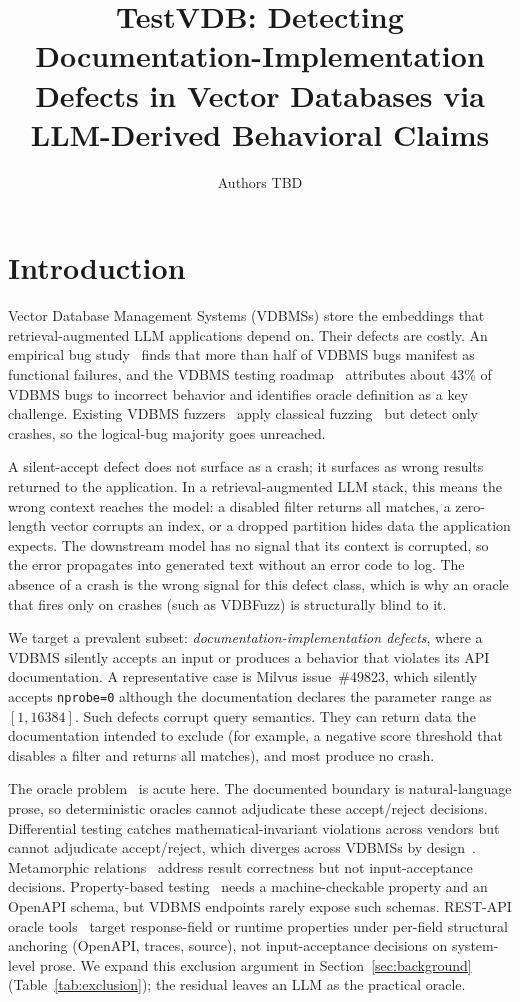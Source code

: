 \documentclass[sigconf]{acmart}
\title[TestVDB: doc-implementation defects in VDBMSs]{TestVDB: Detecting Documentation-Implementation Defects in Vector Databases via LLM-Derived Behavioral Claims}
\author{Authors TBD}
\affiliation{\institution{TBD (anonymity depends on venue)}\country{TBD}}
\begin{document}
\maketitle

\section{Introduction}
\label{sec:intro}

Vector Database Management Systems (VDBMSs) store the embeddings that retrieval-augmented LLM applications depend on. Their defects are costly. An empirical bug study~\cite{bugstudy25} finds that more than half of VDBMS bugs manifest as functional failures, and the VDBMS testing roadmap~\cite{roadmap25} attributes about 43\% of VDBMS bugs to incorrect behavior and identifies oracle definition as a key challenge. Existing VDBMS fuzzers~\cite{vdbfuzz26} apply classical fuzzing~\cite{manes21} but detect only crashes, so the logical-bug majority goes unreached.

A silent-accept defect does not surface as a crash; it surfaces as wrong results returned to the application. In a retrieval-augmented LLM stack, this means the wrong context reaches the model: a disabled filter returns all matches, a zero-length vector corrupts an index, or a dropped partition hides data the application expects. The downstream model has no signal that its context is corrupted, so the error propagates into generated text without an error code to log. The absence of a crash is the wrong signal for this defect class, which is why an oracle that fires only on crashes (such as VDBFuzz) is structurally blind to it.

We target a prevalent subset: \emph{documentation-implementation defects}, where a VDBMS silently accepts an input or produces a behavior that violates its API documentation. A representative case is Milvus issue~\#49823, which silently accepts \texttt{nprobe=0} although the documentation declares the parameter range as $[1, 16384]$. Such defects corrupt query semantics. They can return data the documentation intended to exclude (for example, a negative score threshold that disables a filter and returns all matches), and most produce no crash.

The oracle problem~\cite{barr15} is acute here. The documented boundary is natural-language prose, so deterministic oracles cannot adjudicate these accept/reject decisions. Differential testing catches mathematical-invariant violations across vendors but cannot adjudicate accept/reject, which diverges across VDBMSs by design~\cite{roadmap25}. Metamorphic relations~\cite{metmap24} address result correctness but not input-acceptance decisions. Property-based testing~\cite{claessen00} needs a machine-checkable property and an OpenAPI schema, but VDBMS endpoints rarely expose such schemas. REST-API oracle tools~\cite{agoraplus25,satori25,mastor26} target response-field or runtime properties under per-field structural anchoring (OpenAPI, traces, source), not input-acceptance decisions on system-level prose. We expand this exclusion argument in Section~\ref{sec:background} (Table~\ref{tab:exclusion}); the residual leaves an LLM as the practical oracle.
\end{document}
